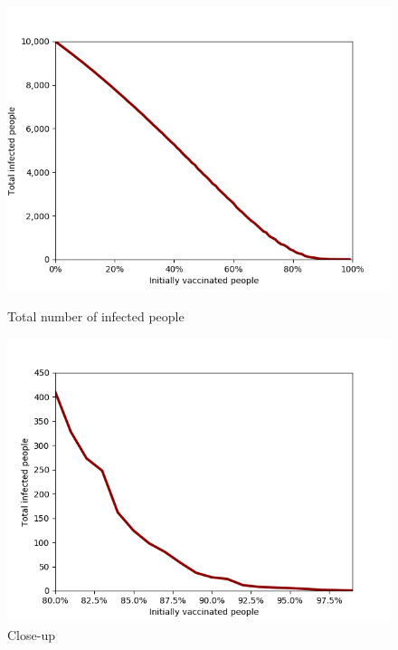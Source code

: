 \documentclass[11pt]{article}
\begin{document}
\begin{figure}[h] %
\centering
\begin{minipage}{.5\textwidth}
  \centering
  \includegraphics[width=1\linewidth]{shorttermwhole}
  \caption{Total number of infected people}  
  \label{fig:5}
  
\end{minipage}%
\begin{minipage}{.5\textwidth}
  \centering
  \includegraphics[width=1\linewidth]{shorttermclose}
  \caption{Close-up}
  \label{fig:6}
 
\end{minipage}%
\end{figure}
\end{document}
